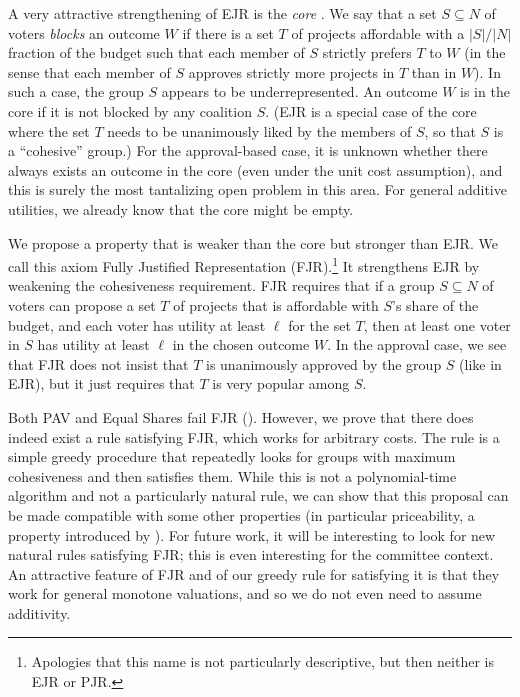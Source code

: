 \documentclass[10pt]{scrartcl}
\theoremstyle{definition}
\theoremstyle{plain}
\begin{document}
A very attractive strengthening of EJR is the \emph{core} \citep{justifiedRepresentation,fain2018fair}. We say that a set $S \subseteq N$ of voters \emph{blocks} an outcome $W$ if there is a set $T$ of  projects affordable with a $|S|/|N|$ fraction of the budget such that each member of $S$ strictly prefers $T$ to $W$ (in the sense that each member of $S$ approves strictly more projects in $T$ than in $W$). In such a case, the group $S$ appears to be underrepresented. An outcome $W$ is in the core if it is not blocked by any coalition $S$. (EJR is a special case of the core where the set $T$ needs to be unanimously liked by the members of $S$, so that $S$ is a ``cohesive'' group.) For the approval-based case, it is unknown whether there always exists an outcome in the core (even under the unit cost assumption), and this is surely the most tantalizing open problem in this area. For general additive utilities, we already know that the core might be empty.

We propose a property that is weaker than the core but stronger than EJR.
We call this axiom Fully Justified Representation (FJR).\footnote{Apologies that this name is not particularly descriptive, but then neither is EJR or PJR.}
It strengthens EJR by weakening the cohesiveness requirement.
FJR requires that if a group $S\subseteq N$ of voters can propose a set $T$ of projects that is affordable with $S$'s share of the budget, and each voter has utility at least $\ell$ for the set $T$, then at least one voter in $S$ has utility at least $\ell$ in the chosen outcome $W$. In the approval case, we see that FJR does not insist that $T$ is unanimously approved by the group $S$ (like in EJR), but it just requires that $T$ is very popular among $S$.

Both PAV and Equal Shares fail FJR (). However, we prove that there does indeed exist a rule satisfying FJR, which works for arbitrary costs. The rule is a simple greedy procedure that repeatedly looks for groups with maximum cohesiveness and then satisfies them. While this is not a polynomial-time algorithm and not a particularly natural rule, we can show that this proposal can be made compatible with some other properties (in particular priceability, a property introduced by \citet{pet-sko:laminar}). For future work, it will be interesting to look for new natural rules satisfying FJR; this is even interesting for the committee context. An attractive feature of FJR and of our greedy rule for satisfying it is that they work for general monotone valuations, and so we do not even need to assume additivity.
\end{document}
